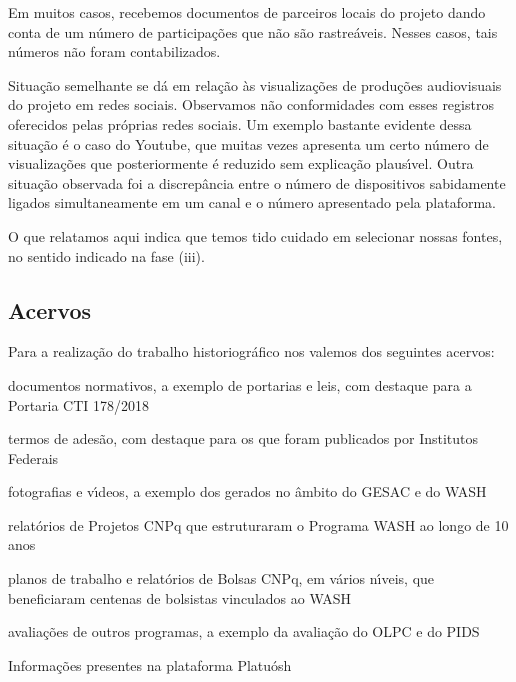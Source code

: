 \documentclass[
12pt,		%
openright,	%
twoside,  %
a4paper,			%
chapter=TITLE,		%
english,			%
french,				%
spanish,			%
brazil				%
]{USPSC-classe/USPSC}
\begin{document}
Em muitos casos, recebemos documentos de parceiros locais do projeto dando conta de um n\'umero de participa\c{c}\~oes que n\~ao s\~ao rastre\'aveis. Nesses casos, tais n\'umeros n\~ao foram contabilizados.










Situa\c{c}\~ao semelhante se d\'a em rela\c{c}\~ao \`as visualiza\c{c}\~oes de produ\c{c}\~oes audiovisuais do projeto em redes sociais. Observamos n\~ao conformidades com esses registros oferecidos pelas pr\'oprias redes sociais. Um exemplo bastante evidente dessa situa\c{c}\~ao \'e o caso do Youtube, que muitas vezes apresenta um certo n\'umero de visualiza\c{c}\~oes que posteriormente \'e reduzido sem explica\c{c}\~ao plaus\'{\i}vel. Outra situa\c{c}\~ao observada foi a discrep\^ancia entre o n\'umero de dispositivos sabidamente ligados simultaneamente em um canal e o n\'umero apresentado pela plataforma.










O que relatamos aqui indica que temos tido cuidado em selecionar nossas fontes, no sentido indicado na fase (iii).










\subsection[Acervos]{Acervos}\label{Acervos}
Para a realiza\c{c}\~ao do trabalho historiogr\'afico nos valemos dos seguintes acervos:











\begin{alineas}
\item documentos normativos, a exemplo de portarias e leis, com destaque para a Portaria CTI 178/2018
\item termos de ades\~ao, com destaque para os que foram publicados por Institutos Federais
\item fotografias e v\'{\i}deos, a exemplo dos gerados no \^ambito do GESAC e do WASH
\item relat\'orios de Projetos CNPq que estruturaram o Programa WASH ao longo de 10 anos
\item planos de trabalho e relat\'orios de Bolsas CNPq, em v\'arios n\'{\i}veis, que beneficiaram centenas de bolsistas vinculados ao WASH
\item avalia\c{c}\~oes de outros programas, a exemplo da avalia\c{c}\~ao do OLPC e do PIDS
\item Informa\c{c}\~oes presentes na plataforma Platu\'osh
\end{alineas}
\end{document}

